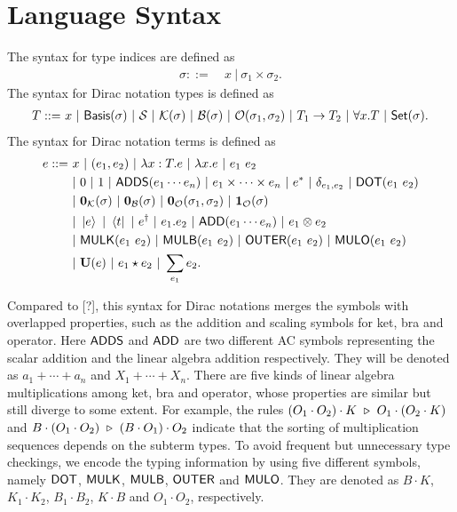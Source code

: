 \documentclass{article}
\begin{document}
\section{Language Syntax}
\begin{definition}[syntax]
    The syntax for type indices are defined as
    \begin{align*}
        \sigma ::=\ & x\ |\ \sigma_1 \times \sigma_2.
    \end{align*}
    The syntax for Dirac notation types is defined as 
    \begin{align*}
        T ::=\ & x\ |\ \Basis(\sigma)\ |\ \SType\ |\ \KType(\sigma)\ |\ \BType(\sigma)\ |\ \OType(\sigma_1, \sigma_2)\ |\ T_1 \to T_2\ |\ \forall x.T\ |\ \SET(\sigma). \\
    \end{align*}
    The syntax for Dirac notation terms is defined as
    \begin{align*}
        e ::=\ & x\ |\ (e_1, e_2)\ |\ \lambda x: T.e\ |\ \lambda x.e\ |\ e_1\ e_2 \\
        & |\ 0\ |\ 1\ |\ \ADDS(e_1 \cdots e_n) \ |\ e_1 \times \cdots \times e_n\ |\ e^* \ |\ \delta_{e_1, e_2}\ |\ \DOT(e_1\ e_2) \\
        & |\ \ZEROK(\sigma)\ |\ \ZEROB(\sigma)\ |\ \ZEROO(\sigma_1, \sigma_2)\ |\ \ONEO(\sigma) \\
        & |\ \ket{e}\ |\ \bra{t}\ |\ e^\dagger\ |\ e_1.e_2\ |\ \ADD(e_1 \cdots e_n)\ |\ e_1 \otimes e_2 \\
        & |\ \MULK(e_1\ e_2)\ |\ \MULB(e_1\ e_2)\ |\ \OUTER(e_1\ e_2)\ |\ \MULO(e_1\ e_2) \\
        & |\ \mathbf{U}(e)\ |\ e_1 \star e_2\ |\ \sum_{e_1} e_2.
    \end{align*}
\end{definition}

Compared to [?], this syntax for Dirac notations merges the symbols with overlapped properties, such as the addition and scaling symbols for ket, bra and operator.
Here $\mathsf{ADDS}$ and $\mathsf{ADD}$ are two different AC symbols representing the scalar addition and the linear algebra addition respectively. They will be denoted as $a_1 + \cdots + a_n$ and $X_1 + \cdots + X_n$.
There are five kinds of linear algebra multiplications among ket, bra and operator, whose properties are similar but still diverge to some extent. For example, the rules $(O_1 \cdot O_2) \cdot K\ \triangleright\ O_1 \cdot (O_2 \cdot K)$ and $B \cdot (O_1 \cdot O_2) \ \triangleright\ (B \cdot O_1) \cdot O_2$ indicate that the sorting of multiplication sequences depends on the subterm types. To avoid frequent but unnecessary type checkings, we encode the typing information by using five different symbols, namely $\mathsf{DOT}$, $\mathsf{MULK}$, $\mathsf{MULB}$, $\mathsf{OUTER}$ and $\mathsf{MULO}$. They are denoted as $B\cdot K$, $K_1 \cdot K_2$, $B_1 \cdot B_2$, $K \cdot B$ and $O_1 \cdot O_2$, respectively.
\end{document}
